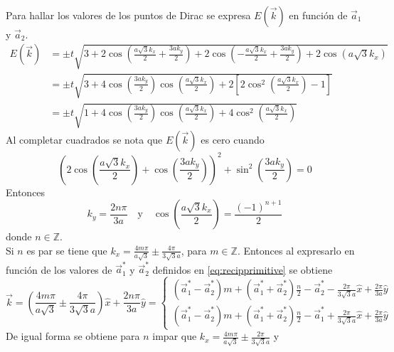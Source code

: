 \\Para hallar los valores de los puntos de Dirac se expresa $E(\vec{k})$ en función de $\vec{a}_1$ y $\vec{a}_2$.
\begin{align}
	\nonumber E(\vec{k}) & = \pm t \sqrt{3+2 \cos\left(\frac{a \sqrt{3}k_x}{2}+\frac{3ak_y}{2}\right)+2 \cos\left(-\frac{a \sqrt{3}k_x}{2}+\frac{3ak_y}{2}\right)+2 \cos\left(a \sqrt{3}k_x\right)} \\
	\nonumber            & = \pm t \sqrt{3+4 \cos\left(\frac{3ak_y}{2}\right) \cos\left(\frac{a\sqrt{3}k_x}{2}\right)+2\left[2 \cos^{2}\left(\frac{a \sqrt{3}k_x}{2}\right)-1\right]}               \\
	                     & = \pm t \sqrt{1+4 \cos\left(\frac{3ak_y}{2}\right) \cos\left(\frac{a\sqrt{3}k_x}{2}\right)+4 \cos^{2}\left(\frac{a \sqrt{3}k_x}{2}\right)}
\end{align}
Al completar cuadrados se nota que $E(\vec{k})$ es cero cuando
\begin{equation}
	\left(2 \cos\left(\frac{a\sqrt{3}k_x}{2}\right)+\cos\left(\frac{3ak_y}{2}\right)\right)^2+ \sin^2\left(\frac{3ak_y}{2}\right) = 0
\end{equation}
Entonces
\begin{equation}
	k_y = \frac{2n \pi}{3a}\quad \text{y}\quad\cos\left(\frac{a\sqrt{3}k_x}{2}\right)=\frac{\left(-1\right)^{n+1}}{2}
\end{equation}
donde $n \in \mathbb{Z}$.\\
Si $n$ es par se tiene que $k_x = \frac{4m\pi}{a\sqrt{3}}\pm \frac{4\pi}{3\sqrt{3}a}$, para $m \in \mathbb{Z}$. Entonces al expresarlo en función de los valores de $\vec{a}_1^{\ast}$ y $\vec{a}_2^{\ast}$ definidos en \eqref{eq:recipprimitive} se obtiene
\begin{equation}
	\vec{k} = \left(\frac{4m\pi}{a\sqrt{3}}\pm \frac{4\pi}{3\sqrt{3}a}\right)\hat{x} + \frac{2n\pi}{3a}\hat{y} = \begin{cases}
		(\vec{a}_1^{\ast} - \vec{a}_2^{\ast})m + (\vec{a}_1^{\ast} + \vec{a}_2^{\ast})\frac{n}{2}-\vec{a}_2^{\ast}- \frac{2\pi}{3\sqrt{3}a}\hat{x}+\frac{2\pi}{3a}\hat{y} \\
		(\vec{a}_1^{\ast} - \vec{a}_2^{\ast})m + (\vec{a}_1^{\ast} + \vec{a}_2^{\ast})\frac{n}{2}-\vec{a}_1^{\ast}+ \frac{2\pi}{3\sqrt{3}a}\hat{x}+\frac{2\pi}{3a}\hat{y}
	\end{cases}
\end{equation}
De igual forma se obtiene para $n$ impar que $k_x = \frac{4m\pi}{a\sqrt{3}}\pm \frac{2\pi}{3\sqrt{3}a}$ y
